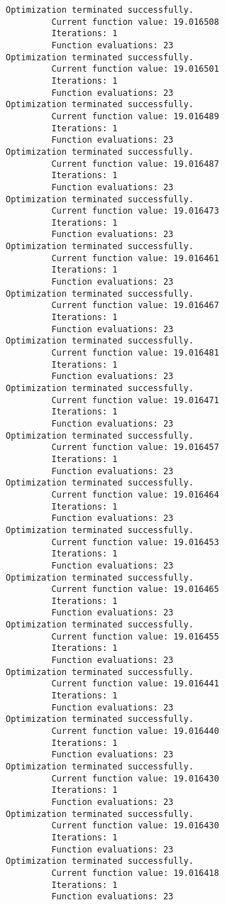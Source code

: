 \documentclass[11pt]{article}
\begin{document}
\begin{Verbatim}[commandchars=\\\{\}]
Optimization terminated successfully.
         Current function value: 19.016508
         Iterations: 1
         Function evaluations: 23
Optimization terminated successfully.
         Current function value: 19.016501
         Iterations: 1
         Function evaluations: 23
Optimization terminated successfully.
         Current function value: 19.016489
         Iterations: 1
         Function evaluations: 23
Optimization terminated successfully.
         Current function value: 19.016487
         Iterations: 1
         Function evaluations: 23
Optimization terminated successfully.
         Current function value: 19.016473
         Iterations: 1
         Function evaluations: 23
Optimization terminated successfully.
         Current function value: 19.016461
         Iterations: 1
         Function evaluations: 23
Optimization terminated successfully.
         Current function value: 19.016467
         Iterations: 1
         Function evaluations: 23
Optimization terminated successfully.
         Current function value: 19.016481
         Iterations: 1
         Function evaluations: 23
Optimization terminated successfully.
         Current function value: 19.016471
         Iterations: 1
         Function evaluations: 23
Optimization terminated successfully.
         Current function value: 19.016457
         Iterations: 1
         Function evaluations: 23
Optimization terminated successfully.
         Current function value: 19.016464
         Iterations: 1
         Function evaluations: 23
Optimization terminated successfully.
         Current function value: 19.016453
         Iterations: 1
         Function evaluations: 23
Optimization terminated successfully.
         Current function value: 19.016465
         Iterations: 1
         Function evaluations: 23
Optimization terminated successfully.
         Current function value: 19.016455
         Iterations: 1
         Function evaluations: 23
Optimization terminated successfully.
         Current function value: 19.016441
         Iterations: 1
         Function evaluations: 23
Optimization terminated successfully.
         Current function value: 19.016440
         Iterations: 1
         Function evaluations: 23
Optimization terminated successfully.
         Current function value: 19.016430
         Iterations: 1
         Function evaluations: 23
Optimization terminated successfully.
         Current function value: 19.016430
         Iterations: 1
         Function evaluations: 23
Optimization terminated successfully.
         Current function value: 19.016418
         Iterations: 1
         Function evaluations: 23

\end{Verbatim}
\end{document}

